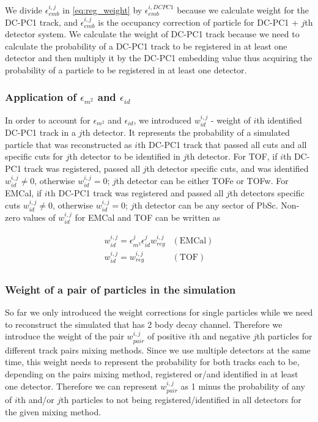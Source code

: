 We divide $\epsilon_{emb}^{i,j}$ in \ref{eq:reg_weight} by $\epsilon_{emb}^{i, DCPC1}$ because we calculate weight for the DC-PC1 track, and $\epsilon_{emb}^{i,j}$ is the occupancy correction of particle for DC-PC1 + $j$th detector system. We calculate the weight of DC-PC1 track because we need to calculate the probability of a DC-PC1 track to be registered in at least one detector and then multiply it by the DC-PC1 embedding value thus acquiring the probability of a particle to be registered in at least one detector.

\subsubsection{Application of $\epsilon_{m^2}$ and $\epsilon_{id}$}

In order to account for $\epsilon_{m^2}$ and $\epsilon_{id}$, we introduced $w_{id}^{i,j}$ - weight of $i$th identified DC-PC1 track in a $j$th detector. It represents the probability of a simulated particle that was reconstructed as $i$th DC-PC1 track that passed all cuts and all specific cuts for $j$th detector to be identified in $j$th detector. For TOF, if $i$th DC-PC1 track was registered, passed all $j$th detector specific cuts, and was identified $w_{id}^{i,j} \neq 0$, otherwise $w_{id}^{i,j} = 0$; $j$th detector can be either TOFe or TOFw. For EMCal, if $i$th DC-PC1 track was registered and passed all $j$th detectors specific cuts $w_{id}^{i,j} \neq 0$, otherwise $w_{id}^{i,j} = 0$; $j$th detector can be any sector of PbSc. Non-zero values of $w_{id}^{i,j}$ for EMCal and TOF can be written as

\begin{equation}
	\begin{matrix}
		w_{id}^{i,j} = \epsilon_{m^2}^j \epsilon_{id}^j w_{reg}^{i,j} & \left( \text{EMCal} \right) \\
		w_{id}^{i,j} = w_{reg}^{i,j} & \left( \text{TOF} \right) \\
	\end{matrix}
\end{equation}

\subsubsection{Weight of a pair of particles in the simulation}

So far we only introduced the weight corrections for single particles while we need to reconstruct the simulated \Kstar that has 2 body decay channel. Therefore we introduce the weight of the pair $w_{pair}^{i,j}$ of positive $i$th and negative $j$th particles for different track pairs mixing methods. Since we use multiple detectors at the same time, this weight needs to represent the probability for both tracks each to be, depending on the pairs mixing method, registered or/and identified in at least one detector. Therefore we can represent $w_{pair}^{i,j}$ as 1 minus the probability of any of $i$th and/or $j$th particles to not being registered/identified in all detectors for the given mixing method.

